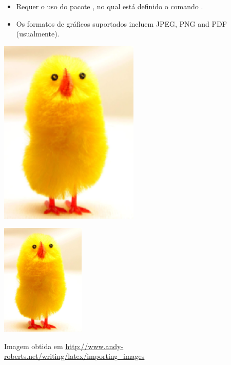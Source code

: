 \documentclass[xcolor=table]{beamer}
\begin{document}
\begin{frame}[fragile]{\insertsubsection}
	\begin{itemize}
		\item Requer o uso do pacote , no qual está definido o 
		comando .
		\item Os formatos de gráficos suportados incluem JPEG, PNG and PDF (usualmente). 
	\end{itemize}
	\begin{exampletwouptiny}
		\includegraphics[width=0.5\textwidth]
		{big_chick}
		
		\includegraphics[width=0.3\textwidth,
						angle=270]{big_chick}
	\end{exampletwouptiny}
	
	\tiny{Imagem obtida em \url{http://www.andy-roberts.net/writing/latex/importing_images}}
\end{frame}
\end{document}
